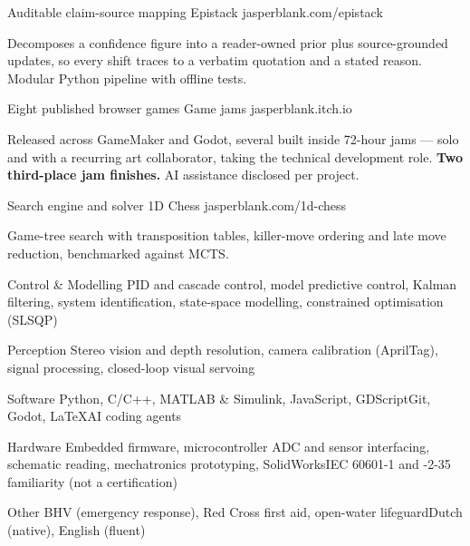 \documentclass[10pt, a4paper]{awesome-cv}
\begin{document}
\begin{cventries}

\cventry
  {Auditable claim-source mapping}
  {Epistack}
  {jasperblank.com/epistack}
  {}
  {
    \begin{cvitems}
      \item {Decomposes a confidence figure into a reader-owned prior plus source-grounded updates, so every shift traces to a verbatim quotation and a stated reason. Modular Python pipeline with offline tests.}
    \end{cvitems}
  }

\cventry
  {Eight published browser games}
  {Game jams}
  {jasperblank.itch.io}
  {}
  {
    \begin{cvitems}
      \item {Released across GameMaker and Godot, several built inside 72-hour jams — solo and with a recurring art collaborator, taking the technical development role. \textbf{Two third-place jam finishes.} AI assistance disclosed per project.}
    \end{cvitems}
  }

\cventry
  {Search engine and solver}
  {1D Chess}
  {jasperblank.com/1d-chess}
  {}
  {
    \begin{cvitems}
      \item {Game-tree search with transposition tables, killer-move ordering and late move reduction, benchmarked against MCTS.}
    \end{cvitems}
  }

\end{cventries}


\begin{cvskills}

\cvskill
  {Control \& Modelling}
  {PID and cascade control, model predictive control, Kalman filtering, system identification, state-space modelling, constrained optimisation (SLSQP)}

\cvskill
  {Perception}
  {Stereo vision and depth resolution, camera calibration (AprilTag), signal processing, closed-loop visual servoing}

\cvskill
  {Software}
  {Python, C/C++, MATLAB \& Simulink, JavaScript, GDScript{\enskip\cdotp\enskip}Git, Godot, \LaTeX{\enskip\cdotp\enskip}AI coding agents}

\cvskill
  {Hardware}
  {Embedded firmware, microcontroller ADC and sensor interfacing, schematic reading, mechatronics prototyping, SolidWorks{\enskip\cdotp\enskip}IEC 60601-1 and -2-35 familiarity (not a certification)}

\cvskill
  {Other}
  {BHV (emergency response), Red Cross first aid, open-water lifeguard{\enskip\cdotp\enskip}Dutch (native), English (fluent)}

\end{cvskills}
\end{document}
